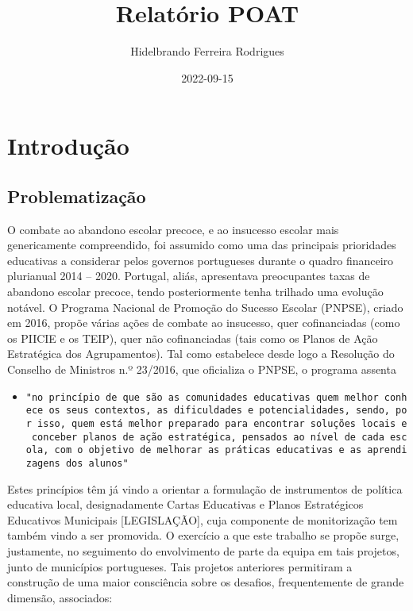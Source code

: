\documentclass[
]{book}
\title{Relatório POAT}
\author{Hidelbrando Ferreira Rodrigues}
\date{2022-09-15}
\providecommand{\tightlist}{%
  \setlength{\itemsep}{0pt}\setlength{\parskip}{0pt}}
\theoremstyle{definition}
\theoremstyle{definition}
\theoremstyle{definition}
\theoremstyle{definition}
\theoremstyle{remark}
\begin{document}
\maketitle

{
\setcounter{tocdepth}{1}
\tableofcontents
}
\hypertarget{introduuxe7uxe3o}{%
\chapter{Introdução}\label{introduuxe7uxe3o}}

\hypertarget{problematizauxe7uxe3o}{%
\section{Problematização}\label{problematizauxe7uxe3o}}

O combate ao abandono escolar precoce, e ao insucesso escolar mais genericamente compreendido, foi assumido como uma das principais prioridades educativas a considerar pelos governos portugueses durante o quadro financeiro plurianual 2014 -- 2020. Portugal, aliás, apresentava preocupantes taxas de abandono escolar precoce, tendo posteriormente tenha trilhado uma evolução notável. O Programa Nacional de Promoção do Sucesso Escolar (PNPSE), criado em 2016, propõe várias ações de combate ao insucesso, quer cofinanciadas (como os PIICIE e os TEIP), quer não cofinanciadas (tais como os Planos de Ação Estratégica dos Agrupamentos). Tal como estabelece desde logo a Resolução do Conselho de Ministros n.º 23/2016, que oficializa o PNPSE, o programa assenta

\begin{itemize}
\tightlist
\item
  \texttt{"no\ princípio\ de\ que\ são\ as\ comunidades\ educativas\ quem\ melhor\ conhece\ os\ seus\ contextos,\ as\ dificuldades\ e\ potencialidades,\ sendo,\ por\ isso,\ quem\ está\ melhor\ preparado\ para\ encontrar\ soluções\ locais\ e\ conceber\ planos\ de\ ação\ estratégica,\ pensados\ ao\ nível\ de\ cada\ escola,\ com\ o\ objetivo\ de\ melhorar\ as\ práticas\ educativas\ e\ as\ aprendizagens\ dos\ alunos"}
\end{itemize}

Estes princípios têm já vindo a orientar a formulação de instrumentos de política educativa local, designadamente Cartas Educativas e Planos Estratégicos Educativos Municipais {[}LEGISLAÇÃO{]}, cuja componente de monitorização tem também vindo a ser promovida. O exercício a que este trabalho se propõe surge, justamente, no seguimento do envolvimento de parte da equipa em tais projetos, junto de municípios portugueses. Tais projetos anteriores permitiram a construção de uma maior consciência sobre os desafios, frequentemente de grande dimensão, associados:
\end{document}
